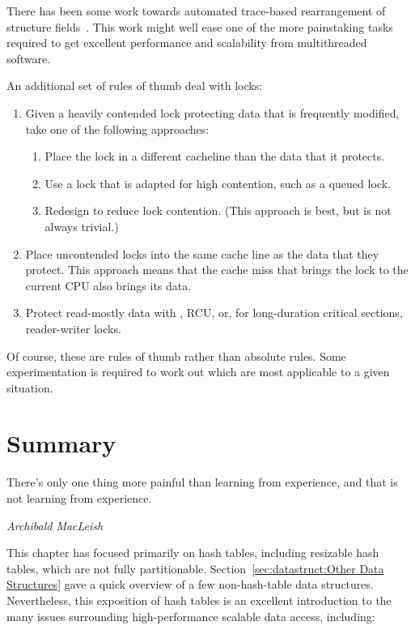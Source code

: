 There has been some work towards automated trace-based rearrangement
of structure
fields~\cite{Golovanevsky:2010:TDL:2174824.2174835}.
This work might well ease one of the more painstaking tasks
required to get excellent performance and scalability from
multithreaded software.

An additional set of rules of thumb deal with locks:

\begin{enumerate}
\item	Given a heavily contended lock protecting data that is
	frequently modified, take one of the following approaches:
	\begin{enumerate}
	\item	Place the lock in a different cacheline than the data
		that it protects.
	\item	Use a lock that is adapted for high contention, such
		as a queued lock.
	\item	Redesign to reduce lock contention.
		(This approach is best, but is not always trivial.)
	\end{enumerate}
\item	Place uncontended locks into the same cache line as the data
	that they protect.
	This approach means that the cache miss that brings the
	lock to the current CPU also brings its data.
\item	Protect read-mostly data with , RCU, or, for
	long-duration critical sections, reader-writer locks.
\end{enumerate}

Of course, these are rules of thumb rather than absolute rules.
Some experimentation is required to work out which are most applicable
to a given situation.

\section{Summary}
\label{sec:datastruct:Summary}
%
\epigraph{There's only one thing more painful than learning from
	  experience, and that is not learning from experience.}
	 {\emph{Archibald MacLeish}}

This chapter has focused primarily on hash tables, including resizable
hash tables, which are not fully partitionable.
Section~\ref{sec:datastruct:Other Data Structures} gave a quick
overview of a few non-hash-table data structures.
Nevertheless, this exposition of hash tables is an excellent introduction
to the many issues surrounding high-performance scalable data access,
including:

